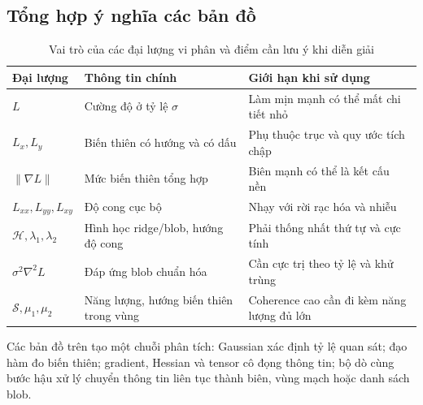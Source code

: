 \subsection{Tổng hợp ý nghĩa các bản đồ}
\begin{table}[t]
\centering
\caption{Vai trò của các đại lượng vi phân và điểm cần lưu ý khi diễn giải}
\begin{tabularx}{\textwidth}{lXX}
\toprule
Đại lượng & Thông tin chính & Giới hạn khi sử dụng\\
\midrule
$L$ & Cường độ ở tỷ lệ $\sigma$ & Làm mịn mạnh có thể mất chi tiết nhỏ\\
$L_x,L_y$ & Biến thiên có hướng và có dấu & Phụ thuộc trục và quy ước tích chập\\
$\|\nabla L\|$ & Mức biến thiên tổng hợp & Biên mạnh có thể là kết cấu nền\\
$L_{xx},L_{yy},L_{xy}$ & Độ cong cục bộ & Nhạy với rời rạc hóa và nhiễu\\
$\mathcal H,\lambda_1,\lambda_2$ & Hình học ridge/blob, hướng độ cong & Phải thống nhất thứ tự và cực tính\\
$\sigma^2\nabla^2L$ & Đáp ứng blob chuẩn hóa & Cần cực trị theo tỷ lệ và khử trùng\\
$\mathcal S,\mu_1,\mu_2$ & Năng lượng, hướng biến thiên trong vùng & Coherence cao cần đi kèm năng lượng đủ lớn\\
\bottomrule
\end{tabularx}
\end{table}
Các bản đồ trên tạo một chuỗi phân tích: Gaussian xác định tỷ lệ quan sát; đạo hàm đo biến thiên; gradient, Hessian và tensor cô đọng thông tin; bộ dò cùng bước hậu xử lý chuyển thông tin liên tục thành biên, vùng mạch hoặc danh sách blob.
